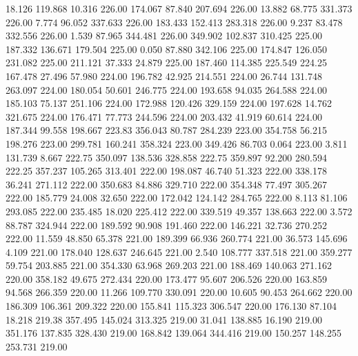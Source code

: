   18.126  119.868   10.316       226.00
 174.067   87.840  207.694       226.00
  13.882   68.775  331.373       226.00
   7.774   96.052  337.633       226.00
 183.433  152.413  283.318       226.00
   9.237   83.478  332.556       226.00
   1.539   87.965  344.481       226.00
 349.902  102.837  310.425       225.00
 187.332  136.671  179.504       225.00
   0.050   87.880  342.106       225.00
 174.847  126.050  231.082       225.00
 211.121   37.333   24.879       225.00
 187.460  114.385  225.549       224.25
 167.478   27.496   57.980       224.00
 196.782   42.925  214.551       224.00
  26.744  131.748  263.097       224.00
 180.054   50.601  246.775       224.00
 193.658   94.035  264.588       224.00
 185.103   75.137  251.106       224.00
 172.988  120.426  329.159       224.00
 197.628   14.762  321.675       224.00
 176.471   77.773  244.596       224.00
 203.432   41.919   60.614       224.00
 187.344   99.558  198.667       223.83
 356.043   80.787  284.239       223.00
 354.758   56.215  198.276       223.00
 299.781  160.241  358.324       223.00
 349.426   86.703    0.064       223.00
   3.811  131.739    8.667       222.75
 350.097  138.536  328.858       222.75
 359.897   92.200  280.594       222.25
 357.237  105.265  313.401       222.00
 198.087   46.740   51.323       222.00
 338.178   36.241  271.112       222.00
 350.683   84.886  329.710       222.00
 354.348   77.497  305.267       222.00
 185.779   24.008   32.650       222.00
 172.042  124.142  284.765       222.00
   8.113   81.106  293.085       222.00
 235.485   18.020  225.412       222.00
 339.519   49.357  138.663       222.00
   3.572   88.787  324.944       222.00
 189.592   90.908  191.460       222.00
 146.221   32.736  270.252       222.00
  11.559   48.850   65.378       221.00
 189.399   66.936  260.774       221.00
  36.573  145.696    4.109       221.00
 178.040  128.637  246.645       221.00
   2.540  108.777  337.518       221.00
 359.277   59.754  203.885       221.00
 354.330   63.968  269.203       221.00
 188.469  140.063  271.162       220.00
 358.182   49.675  272.434       220.00
 173.477   95.607  206.526       220.00
 163.859   94.568  266.359       220.00
  11.266  109.770  330.091       220.00
  10.605   90.453  264.662       220.00
 186.309  106.361  209.322       220.00
 155.841  115.323  306.547       220.00
 176.130   87.104   18.218       219.38
 357.495  145.024  313.325       219.00
  31.041  138.885   16.190       219.00
 351.176  137.835  328.430       219.00
 168.842  139.064  344.416       219.00
 150.257  148.255  253.731       219.00
